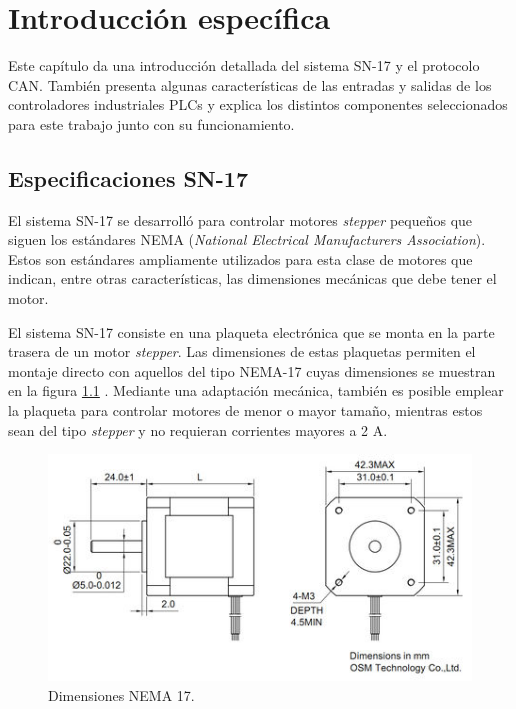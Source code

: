 \chapter{Introducción específica} %

\label{Chapter2}

Este capítulo da una introducción detallada del sistema SN-17 y el protocolo CAN. También presenta algunas características de las entradas y salidas de los controladores industriales PLCs y explica los distintos componentes seleccionados para este trabajo junto con su funcionamiento.

\section{Especificaciones SN-17}

El sistema SN-17 se desarrolló para controlar motores \textit{stepper} pequeños que siguen los estándares NEMA (\textit{National Electrical Manufacturers Association})\citep{web_nema}. Estos son estándares ampliamente utilizados para esta clase de motores que indican, entre otras características, las dimensiones mecánicas que debe tener el motor. 

El sistema SN-17 consiste en una plaqueta electrónica que se monta en la parte trasera de un motor \textit{stepper}. Las dimensiones de estas plaquetas permiten el montaje directo con aquellos del tipo NEMA-17 cuyas dimensiones se muestran en la figura \ref{fig:dimensiones_nema_17} \citep{web_nema_17_dimensions}. Mediante una adaptación mecánica, también es posible emplear la plaqueta para controlar motores de menor o mayor tamaño, mientras estos sean del tipo \textit{stepper} y no requieran corrientes mayores a 2 A.

\begin{figure}[htbp]
	\centering
	\includegraphics[scale=.9]{./Figures/nema17.jpg}
	\caption{Dimensiones NEMA 17\protect\footnotemark .}
	\label{fig:dimensiones_nema_17}
\end{figure}

